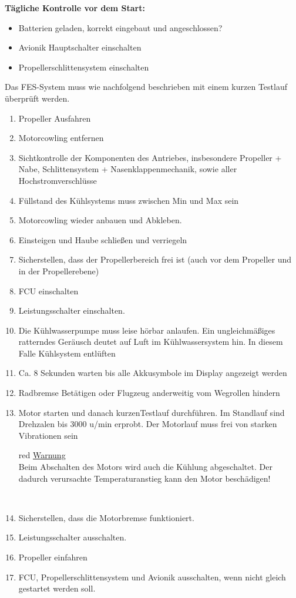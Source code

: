 \textbf{Tägliche Kontrolle vor dem Start: \\}
\begin{itemize}
\item Batterien geladen, korrekt eingebaut und angeschlossen?
\item Avionik Hauptschalter einschalten
\item Propellerschlittensystem einschalten
\end{itemize}

Das FES-System muss wie nachfolgend beschrieben mit einem kurzen Testlauf überprüft werden.\\

\begin{enumerate}

\item Propeller Ausfahren
\item	Motorcowling entfernen
\item	Sichtkontrolle der Komponenten des Antriebes, insbesondere Propeller + Nabe, Schlittensystem + Nasenklappenmechanik, sowie aller Hochstromverschlüsse
\item	 Füllstand des Kühlsystems muss zwischen Min und Max sein
\item	 Motorcowling wieder anbauen und Abkleben.
\item	Einsteigen und Haube schließen und verriegeln
\item	 Sicherstellen, dass der Propellerbereich frei ist (auch vor dem Propeller und in der Propellerebene)
\item	FCU einschalten
\item	Leistungsschalter einschalten.
\item	Die Kühlwasserpumpe muss leise hörbar anlaufen. Ein ungleichmäßiges ratterndes Geräusch deutet auf Luft im Kühlwassersystem hin. In diesem Falle Kühlsystem entlüften
\item	Ca. 8 Sekunden warten bis alle Akkusymbole im Display angezeigt werden
\item	Radbremse Betätigen oder Flugzeug anderweitig vom Wegrollen hindern
\item	 Motor starten und danach kurzenTestlauf durchführen. Im Standlauf sind Drehzalen bis 3000 u/min erprobt. Der Motorlauf muss frei von starken Vibrationen sein

\begin{color}{red}
\large{\underline{Warnung}}\\
Beim Abschalten des Motors wird auch die Kühlung abgeschaltet. Der dadurch verursachte Temperaturanstieg kann den Motor beschädigen!
\end{color}\\

\item	Sicherstellen, dass die Motorbremse funktioniert.
\item	Leistungsschalter ausschalten.
\item	Propeller einfahren
\item	FCU, Propellerschlittensystem und Avionik ausschalten, wenn nicht gleich gestartet werden soll.
\end{enumerate}


